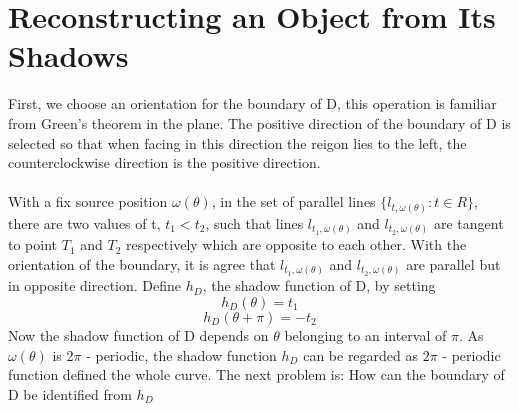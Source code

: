 \documentclass[a4paper]{article}
\begin{document}
\section{Reconstructing an Object from Its Shadows}
First, we choose an orientation for the boundary of D, this operation is familiar from Green's theorem in the plane. The positive direction of the boundary of D is selected so that when facing in this direction the reigon lies to the left, the counterclockwise direction is the positive direction.\\ \\
With a fix source position $\omega(\theta)$, in the set of parallel lines $\{l_{t,\omega(\theta)}:t\in R \}$, there are two values of t, $t_1 < t_2$, such that lines $l_{t_1,\omega(\theta)}$ and $l_{t_2,\omega(\theta)}$ are tangent to point $T_1$ and $T_2$ respectively which are opposite to each other. With the orientation of the boundary, it is agree that $l_{t_1,\omega(\theta)}$ and $l_{t_2,\omega(\theta)}$ are parallel but in opposite direction. Define $h_D$, the shadow function of D, by setting
\begin{equation*}
    h_D(\theta) = t_1
\end{equation*}
\begin{equation*}
    h_D(\theta + \pi) = -t_2
\end{equation*}
Now the shadow function of D depends on $\theta$ belonging to an interval of $\pi$. As $\omega(\theta)$ is $2\pi$ - periodic, the shadow function $h_D$ can be regarded as $2\pi$ - periodic function defined the whole curve. The next problem is: How can the boundary of D be identified from $h_D$\\
\end{document}

